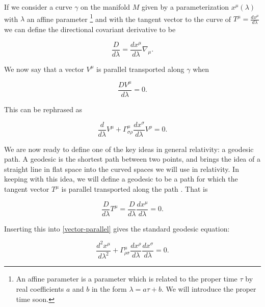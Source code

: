 If we consider a curve \(\gamma\) on the manifold \(M\) given by a parameterization \(x^{\mu} (\lambda)\) with \(\lambda\) an affine parameter \footnote{An affine parameter is a parameter which is related to the proper time \(\tau\) by real coefficients \(a\) and \(b\) in the form \( \lambda = a \tau + b\). We will introduce the proper time soon.} and with the tangent vector to the curve of \(T^{\mu} = \frac{d x^{\mu}}{d \lambda}\) we can define the directional covariant derivative to be \cite{carroll}

\begin{equation} \label{directional}
	\frac{D}{d \lambda} = \frac{d x^{\mu}}{d \lambda} \nabla_{\mu} .
\end{equation}

We now say that a vector \(V^{\mu}\) is parallel transported along \(\gamma\) when

\begin{equation} \label{parallel}
	\frac{D V^{\mu}}{d \lambda} = 0 .
\end{equation}

This can be rephrased as \cite{carroll}

\begin{equation} \label{vector-parallel}
	\frac{d}{d \lambda} V^{\mu} + \Gamma^{\mu}_{\sigma \rho} \frac{d x^{\sigma}}{d \lambda} V^{\rho} = 0 .
\end{equation}

We are now ready to define one of the key ideas in general relativity: a geodesic path. A geodesic is the shortest path between two points, and brings the idea of a straight line in flat space into the curved spaces we will use in relativity. In keeping with this idea, we will define a geodesic to be a path for which the tangent vector \(T^{\mu}\) is parallel transported along the path \cite{carroll}. That is

\begin{equation} \label{geodesic0}
	\frac{D}{d \lambda} T^{\mu} = \frac{D}{d \lambda} \frac{d x^{\mu}}{d \lambda} = 0 .
\end{equation}

Inserting this into \eqref{vector-parallel} gives the standard geodesic equation: 

\begin{equation} \label{geodesic}
	\frac{d^2 x^{\mu}}{d \lambda^2} + \Gamma^{\mu}_{\rho \sigma} \frac{d x^{\rho}}{d \lambda} \frac{d x^{\sigma}}{d \lambda} = 0 .
\end{equation}

